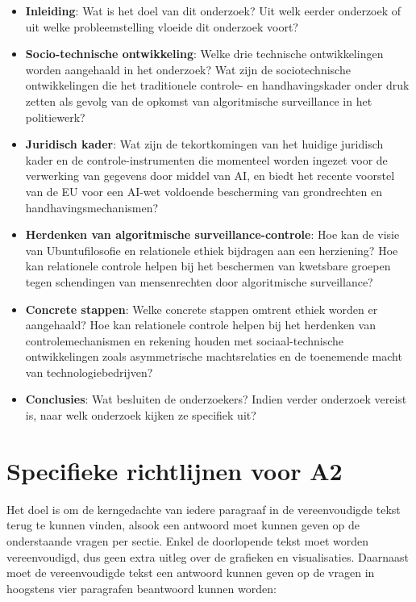 	\begin{itemize}
		\item \textbf{Inleiding}: Wat is het doel van dit onderzoek? Uit welk eerder onderzoek of uit welke probleemstelling vloeide dit onderzoek voort?
		\item \textbf{Socio-technische ontwikkeling}: Welke drie technische ontwikkelingen worden aangehaald in het onderzoek? Wat zijn de sociotechnische ontwikkelingen die het traditionele controle- en handhavingskader onder druk zetten als gevolg van de opkomst van algoritmische surveillance in het politiewerk?
		\item \textbf{Juridisch kader}: Wat zijn de tekortkomingen van het huidige juridisch kader en de controle-instrumenten die momenteel worden ingezet voor de verwerking van gegevens door middel van AI, en biedt het recente voorstel van de EU voor een AI-wet voldoende bescherming van grondrechten en handhavingsmechanismen?
		\item \textbf{Herdenken van algoritmische surveillance-controle}: Hoe kan de visie van Ubuntufilosofie en relationele ethiek bijdragen aan een herziening? Hoe kan relationele controle helpen bij het beschermen van kwetsbare groepen tegen schendingen van mensenrechten door algoritmische surveillance?
		\item \textbf{Concrete stappen}: Welke concrete stappen omtrent ethiek worden er aangehaald? Hoe kan relationele controle helpen bij het herdenken van controlemechanismen en rekening houden met sociaal-technische ontwikkelingen zoals asymmetrische machtsrelaties en de toenemende macht van technologiebedrijven?
		\item \textbf{Conclusies}: Wat besluiten de onderzoekers? Indien verder onderzoek vereist is, naar welk onderzoek kijken ze specifiek uit?
	\end{itemize} 


\section{Specifieke richtlijnen voor A2}

Het doel is om de kerngedachte van iedere paragraaf in de vereenvoudigde tekst terug te kunnen vinden, alsook een antwoord moet kunnen geven op de onderstaande vragen per sectie. Enkel de doorlopende tekst moet worden vereenvoudigd, dus geen extra uitleg over de grafieken en visualisaties. Daarnaast moet de vereenvoudigde tekst een antwoord kunnen geven op de vragen in hoogstens vier paragrafen beantwoord kunnen worden:

